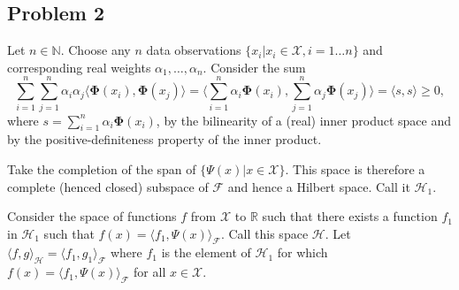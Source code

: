 \documentclass[12pt]{article}
\begin{document}


\subsection{Problem 2}
		Let $n \in \mathbb{N}$. Choose any $n$ data observations $\{x_i | x_i \in \mathcal{X}, i=1\ldots n\}$ and corresponding real weights $\alpha_1, \ldots, \alpha_n$. Consider the sum $$\sum_{i=1}^n \sum_{j=1}^n \alpha_i \alpha_j \langle \mathbf{\Phi}(x_i), \mathbf{\Phi}(x_j) \rangle = \langle \sum_{i=1}^n \alpha_i \mathbf{\Phi}(x_i), \sum_{j=1}^n \alpha_j \mathbf{\Phi}(x_j) \rangle = \langle s, s \rangle \geq 0,$$ where $s=\sum_{i=1}^n \alpha_i \mathbf{\Phi}(x_i)$, by the bilinearity of a (real) inner product space and by the positive-definiteness property of the inner product.

	Take the completion of the span of $\{\Psi(x) | x \in \mathcal{X}\}$. This space is therefore a complete (henced closed) subspace of $\mathcal{F}$ and hence a Hilbert space. Call it $\mathcal{H}_1$.

	Consider the space of functions $f$ from $\mathcal{X}$ to $\mathbb{R}$ such that there exists a function $f_1$ in $\mathcal{H}_1$ such that $f(x) = \langle f_1, \Psi(x) \rangle_\mathcal{F}$. Call this space $\mathcal{H}$. Let $\langle f, g \rangle_\mathcal{H} = \langle f_1, g_1 \rangle_\mathcal{F}$ where $f_1$ is the element of $\mathcal{H}_1$ for which $f(x) = \langle f_1, \Psi(x) \rangle_\mathcal{F}$ for all $x \in \mathcal{X}$. 
\end{document}
